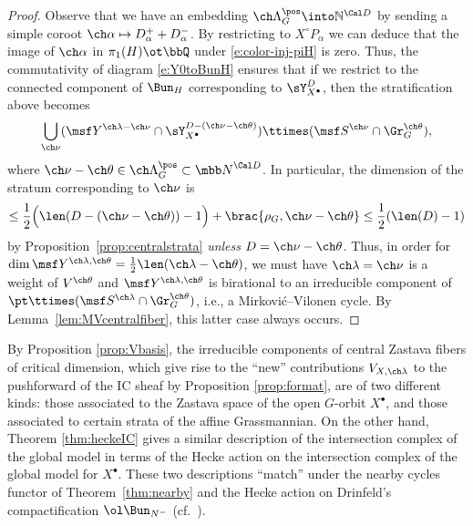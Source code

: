 \begin{proof}
Observe that we have an embedding $\ch\Lambda^\pos_G \into \mathbb N^{\Cal D}$
by sending a simple coroot $\ch\alpha \mapsto D_\alpha^+ + D_\alpha^-$.
By restricting to $X^\circ P_\alpha$ we can deduce that the image of
$\ch\alpha$ in $\pi_1(H)\ot\bbQ$ under \eqref{e:color-inj-piH} is zero.
Thus, the commutativity of diagram \eqref{e:Y0toBunH} ensures that if
we restrict to the connected component of $\Bun_H$ corresponding to
$\sY^{D}_{X^\bullet}$, then the stratification above becomes
\[ \bigcup_{\ch\nu} (\msf Y^{\ch\lambda-\ch\nu}\cap \sY^{D -(\ch\nu-\ch\theta)}_{X^\bullet}) \ttimes (\msf S^{\ch\nu} \cap\Gr^{\ch\theta}_G ),
\]
where $\ch\nu-\ch\theta\in \ch\Lambda^\pos_G \subset {\mbb N}^{\Cal D}$.
In particular, the dimension of the stratum corresponding to $\ch\nu$ is
\[ \le \frac 1 2 \Bigl(\len(D-(\ch\nu-\ch\theta))-1 \Bigr)+ \brac{\rho_G, \ch\nu-\ch\theta}
\le \frac 1 2 (\len(D)-1) \]
by Proposition~\ref{prop:centralstrata} \emph{unless} $D= \ch\nu-\ch\theta$.
Thus, in order for $\dim \msf Y^{\ch\lambda,\ch\theta}=\frac 1 2 \len(\ch\lambda-\ch\theta)$, we must have
$\ch\lambda=\ch\nu$ is a weight of $V^{\ch\theta}$
and $\msf Y^{\ch\lambda,\ch\theta}$ is birational to an irreducible
component of $\pt \ttimes (\msf S^{\ch\lambda}\cap \Gr^{\ch\theta}_G)$, i.e.,
a Mirkovi\'c--Vilonen cycle. By Lemma~\ref{lem:MVcentralfiber},
this latter case always occurs.
\end{proof}


\begin{rem}
\notready
 By Proposition \ref{prop:Vbasis}, the irreducible components of central Zastava fibers of critical dimension, which give rise to the ``new'' contributions $V_{X,\ch\lambda}$ to the pushforward of the IC sheaf by Proposition \ref{prop:format}, are of two different kinds: those associated to the Zastava space of the open $G$-orbit $X^\bullet$, and those associated to certain strata of the affine Grassmannian. On the other hand, Theorem \ref{thm:heckeIC} gives a similar description of the intersection complex of the global model in terms of the Hecke action on the intersection complex of the global model for $X^\bullet$.
These two descriptions ``match'' under the nearby cycles functor of Theorem~\ref{thm:nearby}
and the Hecke action on Drinfeld's compactification $\ol\Bun_{N^-}$ (cf.~\cite{BG}).
\end{rem}
